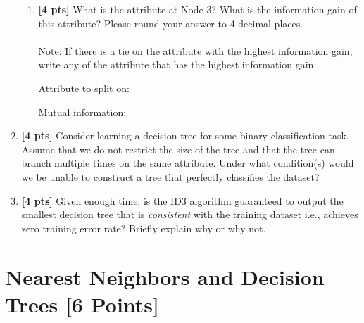 \begin{enumerate}
\begin{enumerate}[label=(\roman*)]
\item \textbf{[4 pts]} What is the attribute at Node 3? What is the information gain of this attribute? Please round your answer to 4 decimal places. \\
\\
Note: If there is a tie on the attribute with the highest information gain, write any of the attribute that has the highest information gain.

Attribute to split on: \begin{tcolorbox}[fit,height=1.2cm, width=3.5cm, blank, borderline={1pt}{-2pt}, nobeforeafter, box align = center] \end{tcolorbox}
\hspace{0.5cm} Mutual information: \begin{tcolorbox}[fit,height=1.2cm, width=3.5cm, blank, borderline={1pt}{-2pt}, nobeforeafter, box align = center] \end{tcolorbox} 

    
\end{enumerate}

\item \textbf{[4 pts]} Consider learning a decision tree for some binary classification task. Assume that we do not restrict the size of the tree and that the tree can branch multiple times on the same attribute. Under what condition(s) would we be unable to construct a tree that perfectly classifies the dataset?  
\begin{tcolorbox}[fit,height=5cm, width=15cm, blank, borderline={1pt}{-2pt}]

\end{tcolorbox}


\item \textbf{[4 pts]} Given enough time, is the ID3 algorithm guaranteed to output the smallest decision tree that is \emph{consistent} with the training dataset i.e., achieves zero training error rate? Briefly explain why or why not. 
\begin{tcolorbox}[fit,height=5cm, width=15cm, blank, borderline={1pt}{-2pt}]
\end{tcolorbox}


\end{enumerate}
\newpage

\section{Nearest Neighbors and Decision Trees [6 Points]}

